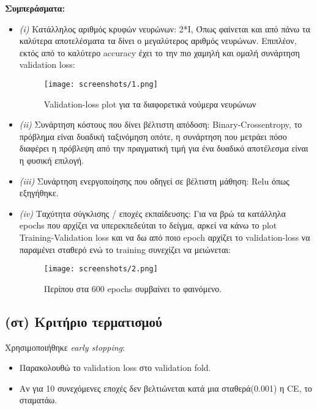 \documentclass[a4paper,11pt]{article}
\begin{document}
\noindent
\textbf{Συμπεράσματα:}
\begin{itemize}
    \item \emph{(i)} Κατάλληλος αριθμός κρυφών νευρώνων: 2*I, Όπως φαίνεται και από πάνω τα καλύτερα αποτελέσματα τα δίνει ο μεγαλύτερος αριθμός νευρώνων.
    Επιπλέον, εκτός από το καλύτερο accuracy έχει το την πιο χαμηλή και ομαλή συνάρτηση validation loss:

    \begin{figure}[H]  %
        \centering
        \texttt{[image: screenshots/1.png]}
        \caption{Validation-loss plot για τα διαφορετικά νούμερα νευρώνων}
        \label{fig:acc_vs_epochs}
      \end{figure}
      

    \item \emph{(ii)} Συνάρτηση κόστους που δίνει βέλτιστη απόδοση: Binary-Crossentropy, το πρόβλημα είναι δυαδική ταξινόμηση οπότε, η συνάρτηση που 
    μετράει πόσο διαφέρει η πρόβλεψη από την πραγματική τιμή για ένα δυαδικό αποτέλεσμα είναι η φυσική επιλογή. 
    \item \emph{(iii)} Συνάρτηση ενεργοποίησης που οδηγεί σε βέλτιστη μάθηση: Relu όπως εξηγήθηκε.
    \item \emph{(iv)} Ταχύτητα σύγκλισης / εποχές εκπαίδευσης: Για να βρώ τα κατάλληλα epochs που αρχίζει να υπερεκπεδεύται το δείγμα, αρκεί να κάνω το plot Training-Validation loss και να δω
    από ποιο epoch αρχίζει το validation-loss να παραμένει σταθερό ενώ το training συνεχίζει να μειώνεται:

    \begin{figure}[H]
        \centering
        \texttt{[image: screenshots/2.png]}
        \caption{Περίπου στα 600 epochs συμβαίνει το φαινόμενο.}
        \label{fig:two_thirds}
    \end{figure}
\end{itemize}

\subsection{(στ) Κριτήριο τερματισμού}
Χρησιμοποιήθηκε  \emph{early stopping}:
\begin{itemize}
    \item Παρακολουθώ το validation loss στο validation fold.
    \item Αν για 10 συνεχόμενες εποχές δεν βελτιώνεται κατά μια σταθερά(0.001) η CE, το σταματάω.
\end{itemize}
\end{document}
